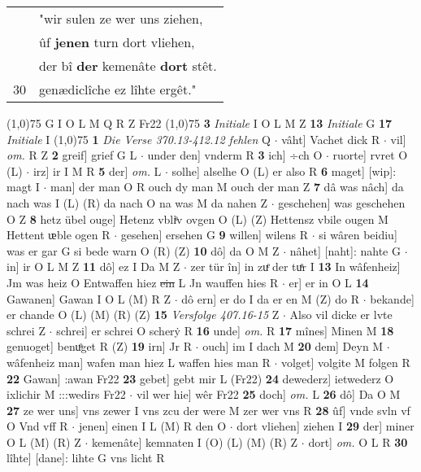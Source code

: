 \documentclass[8pt,a4paper,notitlepage]{article}
\begin{document}
\begin{table}[ht]
\begin{minipage}[t]{0.5\linewidth}
\begin{tabular}{rl}
 & "wir sulen ze wer uns ziehen,\\ 
 & ûf \textbf{jenen} turn dort vliehen,\\ 
 & der bî \textbf{der} kemenâte \textbf{dort} stêt.\\ 
30 & genædiclîche ez lîhte ergêt."\\ 
\end{tabular}
\scriptsize
\line(1,0){75} \newline
G I O L M Q R Z Fr22 \newline
\line(1,0){75} \newline
\textbf{3} \textit{Initiale} I O L M Z  \textbf{13} \textit{Initiale} G  \textbf{17} \textit{Initiale} I  \newline
\line(1,0){75} \newline
\textbf{1} \textit{Die Verse 370.13-412.12 fehlen} Q   $\cdot$ vâht] Vachet dick R  $\cdot$ vil] \textit{om.} R Z \textbf{2} greif] grief G L  $\cdot$ under den] vnderm R \textbf{3} ich] ÷ch O  $\cdot$ ruorte] rvret O (L)  $\cdot$ irz] ir I M R \textbf{5} der] \textit{om.} L  $\cdot$ solhe] alselhe O (L) er also R \textbf{6} maget] [wip]: magt I  $\cdot$ man] der man O R ouch dy man M ouch der man Z \textbf{7} dâ was nâch] da nach was I (L) (R) da nach O na was M da nahen Z  $\cdot$ geschehen] was geschehen O Z \textbf{8} hetz übel ouge] Hetenz vbliͤv ovgen O (L) (Z) Hettensz vbile ougen M Hettent ᵫble ogen R  $\cdot$ gesehen] ersehen G \textbf{9} willen] wilens R  $\cdot$ si wâren beidiu] was er gar G si bede warn O (R) (Z) \textbf{10} dô] da O M Z  $\cdot$ nâhet] [naht]: nahte G  $\cdot$ in] ir O L M Z \textbf{11} dô] ez I Da M Z  $\cdot$ zer tür în] in zuͤ der tuͤr I \textbf{13} In wâfenheiz] Jm was heiz O Entwaffen hiez \sout{ein} L Jn wauffen hies R  $\cdot$ er] er in O L \textbf{14} Gawanen] Gawan I O L (M) R Z  $\cdot$ dô ern] er do I da er en M (Z) do R  $\cdot$ bekande] er chande O (L) (M) (R) (Z) \textbf{15} \textit{Versfolge 407.16-15} Z   $\cdot$ Also vil dicke er lvte schrei Z  $\cdot$ schrei] er schrei O scherẏ R \textbf{16} unde] \textit{om.} R \textbf{17} mînes] Minen M \textbf{18} genuoget] benuͦget R (Z) \textbf{19} irn] Jr R  $\cdot$ ouch] im I dach M \textbf{20} dem] Deyn M  $\cdot$ wâfenheiz man] wafen man hiez L waffen hies man R  $\cdot$ volget] volgite M folgen R \textbf{22} Gawan] :awan Fr22 \textbf{23} gebet] gebt mir L (Fr22) \textbf{24} dewederz] ietwederz O ixlichir M :::wedirs Fr22  $\cdot$ vil wer hie] wêr Fr22 \textbf{25} doch] \textit{om.} L \textbf{26} dô] Da O M \textbf{27} ze wer uns] vns zewer I vns zcu der were M zer wer vns R \textbf{28} ûf] vnde svln vf O Vnd vff R  $\cdot$ jenen] einen I L (M) R den O  $\cdot$ dort vliehen] ziehen I \textbf{29} der] miner O L (M) (R) Z  $\cdot$ kemenâte] kemnaten I (O) (L) (M) (R) Z  $\cdot$ dort] \textit{om.} O L R \textbf{30} lîhte] [dane]: lihte G vns licht R \newline

\end{minipage}
\end{table}
\end{document}
